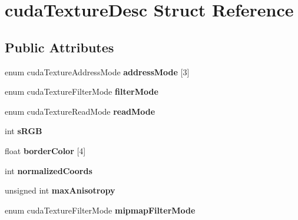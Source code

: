 \hypertarget{structcudaTextureDesc}{}\section{cuda\+Texture\+Desc Struct Reference}
\label{structcudaTextureDesc}
\subsection*{Public Attributes}
\begin{DoxyCompactItemize}
\item 
enum cuda\+Texture\+Address\+Mode {\bfseries address\+Mode} \mbox{[}3\mbox{]}\hypertarget{structcudaTextureDesc_a444fd48870cf61180673e0ed0abb4a1c}{}\label{structcudaTextureDesc_a444fd48870cf61180673e0ed0abb4a1c}

\item 
enum cuda\+Texture\+Filter\+Mode {\bfseries filter\+Mode}\hypertarget{structcudaTextureDesc_ac61993bf71d0cdec670ad92e567ba582}{}\label{structcudaTextureDesc_ac61993bf71d0cdec670ad92e567ba582}

\item 
enum cuda\+Texture\+Read\+Mode {\bfseries read\+Mode}\hypertarget{structcudaTextureDesc_a279c5b27ef0194711344dc402228af94}{}\label{structcudaTextureDesc_a279c5b27ef0194711344dc402228af94}

\item 
int {\bfseries s\+R\+GB}\hypertarget{structcudaTextureDesc_a173e8d365c55f50e9eb586c282af30ca}{}\label{structcudaTextureDesc_a173e8d365c55f50e9eb586c282af30ca}

\item 
float {\bfseries border\+Color} \mbox{[}4\mbox{]}\hypertarget{structcudaTextureDesc_a8a99cc6b95b3629dc204393576ebae9e}{}\label{structcudaTextureDesc_a8a99cc6b95b3629dc204393576ebae9e}

\item 
int {\bfseries normalized\+Coords}\hypertarget{structcudaTextureDesc_a4244ae4f85cd69ff050fdc681be4cd35}{}\label{structcudaTextureDesc_a4244ae4f85cd69ff050fdc681be4cd35}

\item 
unsigned int {\bfseries max\+Anisotropy}\hypertarget{structcudaTextureDesc_a4fadc6bfa59fe7f8f076d58e407381e5}{}\label{structcudaTextureDesc_a4fadc6bfa59fe7f8f076d58e407381e5}

\item 
enum cuda\+Texture\+Filter\+Mode {\bfseries mipmap\+Filter\+Mode}\hypertarget{structcudaTextureDesc_abbdaf1bc430ac931a12ffa7d3f8809ce}{}\label{structcudaTextureDesc_abbdaf1bc430ac931a12ffa7d3f8809ce}


\end{DoxyCompactItemize}
